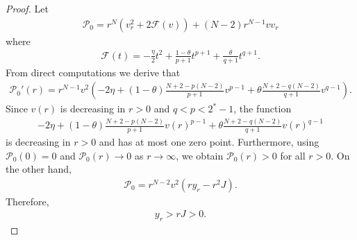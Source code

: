 \documentclass{article}
\theoremstyle{definition} \theoremstyle{remark}
\numberwithin{equation}{section}
\newcommand{\p}{\mathcal{P}}
\begin{document}
	\begin{proof}
		Let
		\begin{align*}
			\p_0 = r^N\left(v_r^2 + 2\mathcal{F}(v)\right) + (N-2)r^{N-1}vv_r
		\end{align*}
		where
		\begin{align*}
			\mathcal{F}(t) = -\frac{\eta}{2}t^2 + \frac{1-\theta}{p+1}t^{p+1} + \frac{\theta}{q+1}t^{q+1}.
		\end{align*}
		From direct computations we derive that
		\begin{align*}
			\p_0'(r) = r^{N-1}v^2\left(-2\eta + (1-\theta)\frac{N+2-p(N-2)}{p+1}v^{p-1} + \theta\frac{N+2-q(N-2)}{q+1}v^{q-1}\right).
		\end{align*}
		Since $v(r)$ is decreasing in $r > 0$ and $q < p < 2^* -1$, the function
		\begin{align*}
			-2\eta + (1-\theta)\frac{N+2-p(N-2)}{p+1}v(r)^{p-1} + \theta\frac{N+2-q(N-2)}{q+1}v(r)^{q-1}
		\end{align*}
		is decreasing in $r > 0$ and has at most one zero point. Furthermore, using $\p_0(0) = 0$ and $\p_0(r) \to 0$ as $r \to \infty$, we obtain $\p_0(r) > 0$ for all $r > 0$. On the other hand,
		\begin{align*}
			\p_0 = r^{N-2}v^2\left(ry_r - r^2J\right).
		\end{align*}
		Therefore,
		\begin{align*}
			y_r > rJ > 0.
		\end{align*}


\end{proof}
\end{document}

